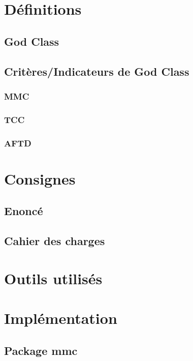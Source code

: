 \documentclass[11pt]{report}
\begin{document}


\tableofcontents


\chapter{Définitions}

	\section{God Class}
	
	\section{Critères/Indicateurs de God Class}
		\subsection{MMC}
		\subsection{TCC}
		\subsection{AFTD}
	
\chapter{Consignes}
	
	\section{Enoncé}
	
	\section{Cahier des charges}
	
\chapter{Outils utilisés}
	

\chapter{Implémentation}

	\section{Package mmc}
\end{document}
